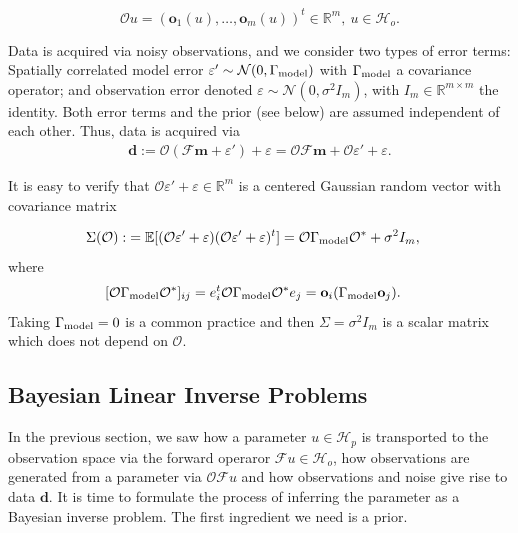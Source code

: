 \documentclass[ba]{imsart}
\newcommand{\R}{\ensuremath{\mathbb{R}}}
\newcommand{\eps}{\varepsilon}
\newcommand{\hilp}{\mathcal{H}_p}
\newcommand{\hilo}{\mathcal{H}_o}
\newcommand{\obs}{\mathcal{O}}
\newcommand{\fwd}{\mathcal{F}}
\newcommand{\data}{\mathbf{d}}
\newcommand{\param}{\mathbf{m}}
\newcommand{\normal}{\mathcal{N}}
\newcommand{\meas}{\mathbf{o}}
\theoremstyle{plain}
\theoremstyle{definition}
\theoremstyle{remark}
\begin{document}
\begin{equation*}\obs u = (\meas_1(u), \dots, \meas_m(u) )^t \in \R^m,\ u \in \hilo.
\end{equation*}

Data is acquired via noisy observations, and we consider two types of
error terms: Spatially correlated model error \(\eps' \sim
\normal(0,\modcov)\) with \(\Gamma_{\textup{model}}\) a covariance operator; and
observation error denoted \(\eps \sim \normal(0, \sigma^2 I_m)\), with
\(I_m \in \mathbb{R}^{m \times m}\) the identity. Both error terms and
the prior (see below) are assumed independent of each other. Thus,
data is acquired via
\begin{align}\label{eq:inverse_problem}
  \data := \obs (\fwd \param + \eps') + \eps = \obs \fwd \param + \obs \eps' + \eps.
\end{align}

It is easy to verify that \(\obs \eps' + \eps \in \R^m\) is a centered
Gaussian random vector with covariance matrix

\begin{align}\label{eq:Sigma}
  \begin{split}
    \Sigma(\obs) :&= \mathbb{E}[ (\obs \eps' + \eps) (\obs \eps' +
      \eps)^t ]
= \obs \modcov \obs^* + \sigma^2I_m , 
  \end{split}
\end{align}
where
\begin{align}\label{eq:modcov_explained}
  \begin{split}
    [\obs \modcov \obs^*]_{ij} & = e_i^t \obs \modcov \obs^* e_j 
= \meas_i (\modcov \meas_j).\end{split}
\end{align}
Taking \(\Gamma_{\textup{model}} = 0\) is a common practice
\cite{tarantola2005,kaipio2005,Vogel02} and then \(\Sigma =
\sigma^2I_m\) is a scalar matrix which does not depend on \(\obs\).

\subsection{Bayesian Linear Inverse Problems}\label{subsec:bayesian_inverse_problems}
In the previous section, we saw how a parameter $u\in \hilp$ is
transported to the observation space via the forward operaror $\fwd u
\in \hilo$, how observations are generated from a parameter via $\obs
\fwd u$ and how observations and noise give rise to data $\data$. It
is time to formulate the process of inferring the parameter as a
Bayesian inverse problem. The first ingredient we need is a prior.
\end{document}
